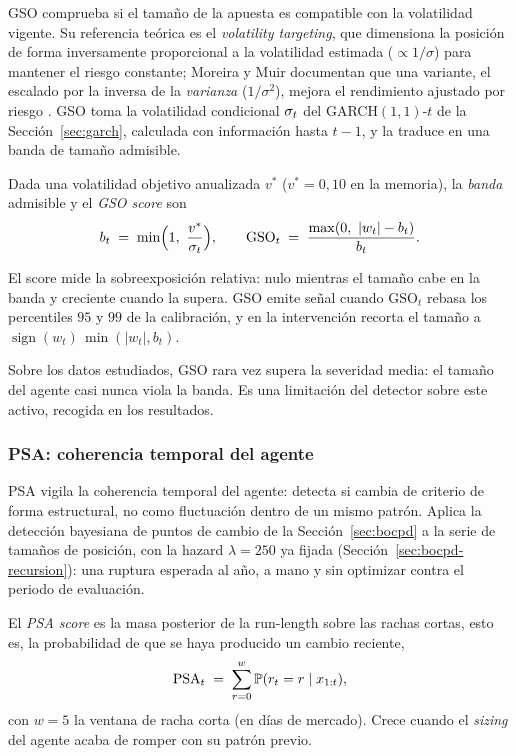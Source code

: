 GSO comprueba si el tamaño de la apuesta es compatible con la volatilidad vigente. Su referencia teórica es el \emph{volatility targeting}, que dimensiona la posición de forma inversamente proporcional a la volatilidad estimada ($\propto 1/\sigma$) para mantener el riesgo constante; Moreira y Muir documentan que una variante, el escalado por la inversa de la \emph{varianza} ($1/\sigma^2$), mejora el rendimiento ajustado por riesgo \cite{moreira2017}. GSO toma la volatilidad condicional $\sigma_t$ del GARCH$(1,1)$-$t$ de la Sección~\ref{sec:garch}, calculada con información hasta $t-1$, y la traduce en una banda de tamaño admisible.

\begin{definicion}
\label{def:gso}
Dada una volatilidad objetivo anualizada $v^{\ast}$ ($v^{\ast}=0{,}10$ en la memoria), la \emph{banda} admisible y el \emph{GSO score} son
\[
b_t \;=\; \min\!\Big(1,\ \frac{v^{\ast}}{\sigmat}\Big),
\qquad
\mathrm{GSO}_t \;=\; \frac{\max(0,\ |w_t| - b_t)}{b_t}.
\]
\end{definicion}

El score mide la sobreexposición relativa: nulo mientras el tamaño cabe en la banda y creciente cuando la supera. GSO emite señal cuando $\mathrm{GSO}_t$ rebasa los percentiles $95$ y $99$ de la calibración, y en la intervención recorta el tamaño a $\operatorname{sign}(w_t)\,\min(|w_t|, b_t)$.

Sobre los datos estudiados, GSO rara vez supera la severidad media: el tamaño del agente casi nunca viola la banda. Es una limitación del detector sobre este activo, recogida en los resultados.

\subsubsection{PSA: coherencia temporal del agente}
\label{sec:strata-psa}

PSA vigila la coherencia temporal del agente: detecta si cambia de criterio de forma estructural, no como fluctuación dentro de un mismo patrón. Aplica la detección bayesiana de puntos de cambio de la Sección~\ref{sec:bocpd} a la serie de tamaños de posición, con la hazard $\lambda = 250$ ya fijada (Sección~\ref{sec:bocpd-recursion}): una ruptura esperada al año, a mano y sin optimizar contra el periodo de evaluación.

\begin{definicion}
\label{def:psa}
El \emph{PSA score} es la masa posterior de la run-length sobre las rachas cortas, esto es, la probabilidad de que se haya producido un cambio reciente,
\[
\mathrm{PSA}_t \;=\; \sum_{r=0}^{w} \mathbb{P}(r_t = r \mid x_{1:t}),
\]
con $w=5$ la ventana de racha corta (en días de mercado). Crece cuando el \emph{sizing} del agente acaba de romper con su patrón previo.
\end{definicion}

